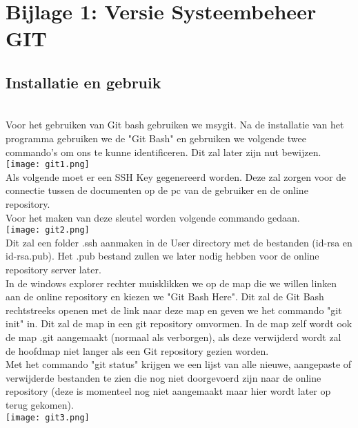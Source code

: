 \label{Bijlage 1}

\appendix
\section{Bijlage 1: Versie Systeembeheer GIT}

\subsection*{Installatie en gebruik}\ \\[6pt]

Voor het gebruiken van Git bash gebruiken we msygit. Na de installatie van het programma gebruiken we de "Git Bash" en gebruiken we volgende twee commando's om ons te kunne identificeren. Dit zal later zijn nut bewijzen.\\
\texttt{[image: git1.png]}\\


Als volgende moet er een SSH Key gegenereerd worden. Deze zal zorgen voor de connectie tussen de documenten op de pc van de gebruiker en de online repository.\\

Voor het maken van deze sleutel worden volgende commando gedaan.\\
\texttt{[image: git2.png]}\\

Dit zal een folder .ssh aanmaken in de User directory met de bestanden (id-rsa en id-rsa.pub). Het .pub bestand zullen we later nodig hebben voor de online repository server later.\\

In de windows explorer rechter muisklikken we op de map die we willen linken aan de online repository en kiezen we "Git Bash Here". Dit zal de Git Bash rechtstreeks openen met de link naar deze map en geven we het commando "git init" in. Dit zal de map in een git repository omvormen. In de map zelf wordt ook de map .git aangemaakt (normaal als verborgen), als deze verwijderd wordt zal de hoofdmap niet langer als een Git repository gezien worden.\\

Met het commando "git status" krijgen we een lijst van alle nieuwe, aangepaste of verwijderde bestanden te zien die nog niet doorgevoerd zijn naar de online repository (deze is momenteel nog niet aangemaakt maar hier wordt later op terug gekomen).\\
\texttt{[image: git3.png]}\\

